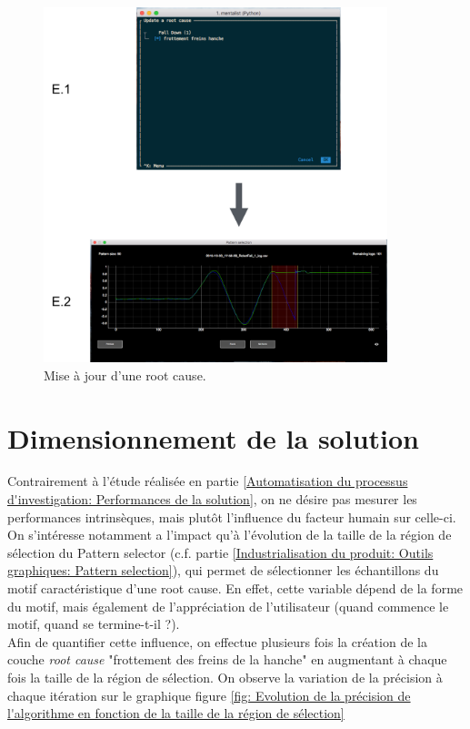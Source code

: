 \begin{figure}[H]
	\centering\includegraphics[width=10cm]{images/update_menu.png}
	\caption[Mise à jour d'une root cause]{Mise à jour d'une root cause.}
	\label{fig: Mise à jour d'une root cause}
\end{figure} 


\section{Dimensionnement de la solution}
\label{Industrialisation du produit: Dimensionnement de la solution}
Contrairement à l'étude réalisée en partie \ref{Automatisation du processus d'investigation: Performances de la solution}, on ne désire pas mesurer les performances intrinsèques, mais plutôt l'influence du facteur humain sur celle-ci. On s'intéresse notamment a l'impact qu'à l'évolution de la taille de la région de sélection du Pattern selector (c.f. partie \ref{Industrialisation du produit: Outils graphiques: Pattern selection}), qui permet de sélectionner les échantillons du motif caractéristique d'une root cause. En effet, cette variable dépend de la forme du motif, mais également de l'appréciation de l'utilisateur (quand commence le motif, quand se termine-t-il ?). \\
Afin de quantifier cette influence, on effectue plusieurs fois la création de la couche \emph{root cause}  "frottement des freins de la hanche" en augmentant à chaque fois la taille de la région de sélection. On observe la variation de la précision à chaque itération sur le graphique figure \ref{fig: Evolution de la précision de l'algorithme en fonction de la taille de la région de sélection}

